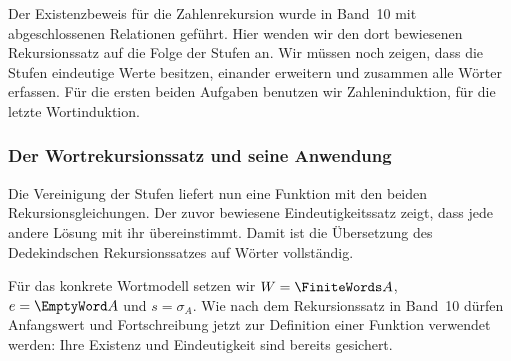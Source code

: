 Der Existenzbeweis für die Zahlenrekursion wurde in Band~10 mit
abgeschlossenen Relationen geführt. Hier wenden wir den dort bewiesenen
Rekursionssatz auf die Folge der Stufen an. Wir müssen noch zeigen,
dass die Stufen eindeutige Werte besitzen, einander erweitern und
zusammen alle Wörter erfassen. Für die ersten beiden Aufgaben benutzen
wir Zahleninduktion, für die letzte Wortinduktion.



\subsubsection{Der Wortrekursionssatz und seine Anwendung}

Die Vereinigung der Stufen liefert nun eine Funktion mit den beiden
Rekursionsgleichungen. Der zuvor bewiesene Eindeutigkeitssatz zeigt,
dass jede andere Lösung mit ihr übereinstimmt. Damit ist die
Übersetzung des Dedekindschen Rekursionssatzes auf Wörter vollständig.

\noindent\begin{minipage}{\linewidth}
\end{minipage}\par
\begin{tabproofwide}
\end{tabproofwide}

Für das konkrete Wortmodell setzen wir \(W=\FiniteWords A\),
\(e=\EmptyWord A\) und \(s=\sigma_A\). Wie nach dem Rekursionssatz
in Band~10 dürfen Anfangswert und Fortschreibung jetzt zur Definition
einer Funktion verwendet werden: Ihre Existenz und Eindeutigkeit sind
bereits gesichert.

